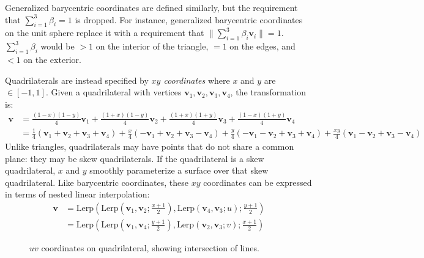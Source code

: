 \documentclass{amsart}[12pt]
\begin{document}
Generalized barycentric coordinates are defined similarly, but the requirement
that $\sum^3_{i=1} \beta_i = 1$ is dropped. For instance, generalized
barycentric coordinates on the unit sphere replace it with a requirement that
$\| \sum^3_{i=1} \beta_i \mathbf v_i \| = 1$. $\sum^3_{i=1} \beta_i$ would be
$>1$ on the interior of the triangle, $=1$ on the edges,
and $<1$ on the exterior.

Quadrilaterals are instead specified by \textit{$xy$ coordinates} where
$x$ and $y$ are $\in [-1, 1]$. Given a quadrilateral with vertices
$\mathbf v_1, \mathbf v_2, \mathbf v_3, \mathbf v_4$, the transformation is:
\begin{equation}\begin{split}
\mathbf v & = \frac{(1-x)(1-y)}{4} \mathbf v_1 +
\frac{(1+x)(1-y)}{4} \mathbf v_2 +
\frac{(1+x)(1+y)}{4} \mathbf v_3 +
\frac{(1-x)(1+y)}{4} \mathbf v_4 \\
&= \frac{1}{4} (\mathbf v_1 +\mathbf v_2 +\mathbf v_3 + \mathbf v_4)
+\frac{x}{4}  (-\mathbf v_1 +\mathbf v_2 +\mathbf v_3 - \mathbf v_4)
+\frac{y}{4}  (-\mathbf v_1 -\mathbf v_2 +\mathbf v_3 + \mathbf v_4)
+\frac{x y}{4} (\mathbf v_1 -\mathbf v_2 +\mathbf v_3 - \mathbf v_4)
\end{split}\end{equation}
Unlike triangles, quadrilaterals may have points that do not share a common
plane: they may be skew quadrilaterals. If the quadrilateral is a skew
quadrilateral, $x$ and $y$ smoothly parameterize a surface over that skew
quadrilateral. Like barycentric coordinates, these $xy$ coordinates can be
expressed in terms of nested linear interpolation:
\begin{equation}\begin{split}
\mathbf v
& = \mathrm{Lerp}(\mathrm{Lerp}(\mathbf v_1,\mathbf v_2;\frac{x+1}{2}),
\mathrm{Lerp}(\mathbf v_4,\mathbf v_3;u);\frac{y+1}{2}) \\
& = \mathrm{Lerp}(\mathrm{Lerp}(\mathbf v_1,\mathbf v_4;\frac{y+1}{2}),
\mathrm{Lerp}(\mathbf v_2,\mathbf v_3;v);\frac{x+1}{2})
\end{split}\end{equation}

\begin{figure}%
\caption{$uv$ coordinates on quadrilateral, showing intersection of lines.}
\label{fig:uv}
\end{figure}
\end{document}
